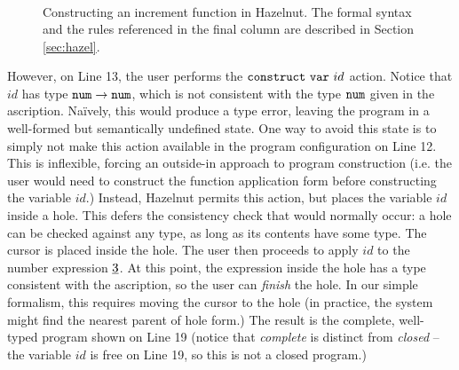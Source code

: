 \begin{figure}[t!]
\[\begin{array}{|c||c|l||l|l|}
\end{array}
\]
\caption{Constructing an increment function in Hazelnut. The formal syntax and the rules referenced in the final column are described in Section \ref{sec:hazel}.}
\label{fig:first-example}
\end{figure}

However, on Line 13, the user performs the $\mathtt{construct}~\mathtt{var}~id$ action. Notice that $id$ has type $\texttt{num} \rightarrow \texttt{num}$, which is not consistent with the type $\texttt{num}$ given in the ascription. Na\"ively, this would produce a type error, leaving the program in a well-formed but semantically undefined state. One way to avoid this state is to simply not make this action available in the program configuration on Line 12. This is inflexible, forcing an outside-in approach to program construction (i.e. the user would need to construct the function application form before constructing the variable $id$.) Instead, Hazelnut permits this action, but places the variable $id$ inside a hole. This defers the consistency check that would normally occur: a hole can be checked against any type, as long as its contents have some type. The cursor is placed inside the hole. The user then proceeds to apply $id$ to the number expression $\underline{3}$. At this point, the expression inside the hole has a type consistent with the ascription, so the user can \emph{finish} the hole. In our simple formalism, this requires moving the cursor to the hole (in practice, the system might find the nearest parent of hole form.) The result is the complete, well-typed program shown on Line 19 (notice that \emph{complete} is distinct from \emph{closed} -- the variable $id$ is free on Line 19, so this is not a closed program.)

